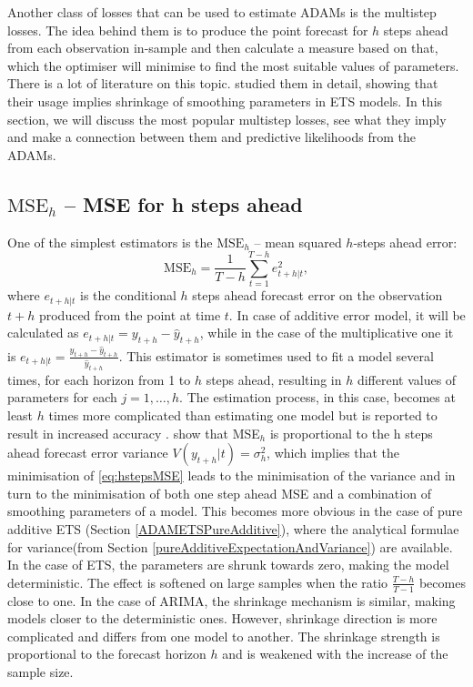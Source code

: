 \documentclass[]{book}
\theoremstyle{definition}
\theoremstyle{definition}
\theoremstyle{definition}
\theoremstyle{definition}
\theoremstyle{remark}
\begin{document}
Another class of losses that can be used to estimate ADAMs is the multistep losses. The idea behind them is to produce the point forecast for \(h\) steps ahead from each observation in-sample and then calculate a measure based on that, which the optimiser will minimise to find the most suitable values of parameters. There is a lot of literature on this topic. \citet{Svetunkov2020Multistep} studied them in detail, showing that their usage implies shrinkage of smoothing parameters in ETS models. In this section, we will discuss the most popular multistep losses, see what they imply and make a connection between them and predictive likelihoods from the ADAMs.

\hypertarget{mathrmmse_h-mse-for-h-steps-ahead}{%
\subsection{\texorpdfstring{\(\mathrm{MSE}_h\) -- MSE for h steps ahead}{\textbackslash{}mathrm\{MSE\}\_h -- MSE for h steps ahead}}\label{mathrmmse_h-mse-for-h-steps-ahead}}

One of the simplest estimators is the \(\mathrm{MSE}_h\) -- mean squared \(h\)-steps ahead error:
\begin{equation}
    \mathrm{MSE}_h = \frac{1}{T-h} \sum_{t=1}^{T-h} e_{t+h|t}^2 ,
  \label{eq:hstepsMSE}
\end{equation}
where \(e_{t+h|t}\) is the conditional \(h\) steps ahead forecast error on the observation \(t+h\) produced from the point at time \(t\). In case of additive error model, it will be calculated as \(e_{t+h|t}=y_{t+h}-\hat{y}_{t+h}\), while in the case of the multiplicative one it is \(e_{t+h|t}=\frac{y_{t+h}-\hat{y}_{t+h}}{\hat{y}_{t+h}}\). This estimator is sometimes used to fit a model several times, for each horizon from 1 to \(h\) steps ahead, resulting in \(h\) different values of parameters for each \(j=1, \ldots, h\). The estimation process, in this case, becomes at least \(h\) times more complicated than estimating one model but is reported to result in increased accuracy \citep[see for example][]{kourentzes2019unconstraining}. \citet{Svetunkov2020Multistep} show that MSE\(_h\) is proportional to the h steps ahead forecast error variance \(V(y_{t+h}|t)=\sigma^2_{h}\), which implies that the minimisation of \eqref{eq:hstepsMSE} leads to the minimisation of the variance and in turn to the minimisation of both one step ahead MSE and a combination of smoothing parameters of a model. This becomes more obvious in the case of pure additive ETS (Section \ref{ADAMETSPureAdditive}), where the analytical formulae for variance(from Section \ref{pureAdditiveExpectationAndVariance}) are available. In the case of ETS, the parameters are shrunk towards zero, making the model deterministic. The effect is softened on large samples when the ratio \(\frac{T-h}{T-1}\) becomes close to one. In the case of ARIMA, the shrinkage mechanism is similar, making models closer to the deterministic ones. However, shrinkage direction is more complicated and differs from one model to another. The shrinkage strength is proportional to the forecast horizon \(h\) and is weakened with the increase of the sample size.
\end{document}
